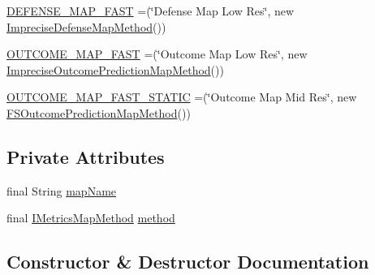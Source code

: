 \begin{DoxyCompactItemize}
\item 
\mbox{\hyperlink{enumanalyse_1_1_e_metrics_map_type_a98059fae4cafdf55bbab59fdc15d3609}{D\+E\+F\+E\+N\+S\+E\+\_\+\+M\+A\+P\+\_\+\+F\+A\+ST}} =(\char`\"{}Defense Map Low Res\char`\"{}, new \mbox{\hyperlink{classanalyse_1_1map_methods_1_1_imprecise_defense_map_method}{Imprecise\+Defense\+Map\+Method}}())
\item 
\mbox{\hyperlink{enumanalyse_1_1_e_metrics_map_type_ad5f567007dc0243bfd6bc876c742fa4a}{O\+U\+T\+C\+O\+M\+E\+\_\+\+M\+A\+P\+\_\+\+F\+A\+ST}} =(\char`\"{}Outcome Map Low Res\char`\"{}, new \mbox{\hyperlink{classanalyse_1_1map_methods_1_1_imprecise_outcome_prediction_map_method}{Imprecise\+Outcome\+Prediction\+Map\+Method}}())
\item 
\mbox{\hyperlink{enumanalyse_1_1_e_metrics_map_type_a1de8a35d8a7d728ed93430a854c03511}{O\+U\+T\+C\+O\+M\+E\+\_\+\+M\+A\+P\+\_\+\+F\+A\+S\+T\+\_\+\+S\+T\+A\+T\+IC}} =(\char`\"{}Outcome Map Mid Res\char`\"{}, new \mbox{\hyperlink{classanalyse_1_1map_methods_1_1_f_s_outcome_prediction_map_method}{F\+S\+Outcome\+Prediction\+Map\+Method}}())
\end{DoxyCompactItemize}
\subsection*{Private Attributes}
\begin{DoxyCompactItemize}
\item 
final String \mbox{\hyperlink{enumanalyse_1_1_e_metrics_map_type_a5f7c7fcfc4cf72cf853278534f74c451}{map\+Name}}
\item 
final \mbox{\hyperlink{interfaceanalyse_1_1map_methods_1_1_i_metrics_map_method}{I\+Metrics\+Map\+Method}} \mbox{\hyperlink{enumanalyse_1_1_e_metrics_map_type_af2f1a914461dd093a014ae66e77ce9b8}{method}}
\end{DoxyCompactItemize}


\subsection{Constructor \& Destructor Documentation}
\mbox{\label{enumanalyse_1_1_e_metrics_map_type_acd09a5d4af291387d883e1f6bc6d265f}} 
